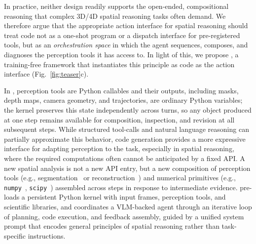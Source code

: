 In practice, neither design readily supports the open-ended, compositional reasoning that complex 3D/4D spatial reasoning tasks often demand.
We therefore argue that the appropriate action interface for spatial reasoning should treat code not as a one-shot program or a dispatch interface for pre-registered tools, but as an \emph{orchestration space} in which the agent sequences, composes, and diagnoses the perception tools it has access to. In light of this, we propose \textbf{\ours{}}, a training-free framework that instantiates this principle as code as the action interface (Fig.~\ref{fig:teaser}c).

In \ours{}, perception tools are Python callables and their outputs, including masks, depth maps, camera geometry, and trajectories, are ordinary Python variables; the kernel preserves this state independently across turns, so any object produced at one step remains available for composition, inspection, and revision at all subsequent steps.
While structured tool-calls and natural language reasoning can partially approximate this behavior, code generation provides a more expressive interface for adapting perception to the task, especially in spatial reasoning, where the required computations often cannot be anticipated by a fixed API.
A new spatial analysis is not a new API entry, but a new composition of perception tools (e.g., segmentation~\citep{carion2025sam} or reconstruction~\citep{depthanything3}) and numerical primitives (e.g., \texttt{numpy}~\citep{harris2020array}, \texttt{scipy}~\citep{2020SciPy-NMeth}) assembled across steps in response to intermediate evidence.
\ours{} pre-loads a persistent Python kernel with input frames, perception tools, and scientific libraries, and coordinates a VLM-backed agent through an iterative loop of planning, code execution, and feedback assembly, guided by a unified system prompt that encodes general principles of spatial reasoning rather than task-specific instructions.

